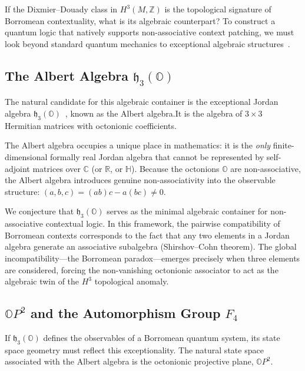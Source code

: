 \documentclass[11pt]{article}
\begin{document}
If the Dixmier--Douady class in $H^3(M, \mathbb{Z})$ is the topological signature of Borromean contextuality, what is its algebraic counterpart? To construct a quantum logic that natively supports non-associative context patching, we must look beyond standard quantum mechanics to exceptional algebraic structures~\cite{Jacobson68}.

\subsection{The Albert Algebra $\mathfrak{h}_3(\mathbb{O})$}

The natural candidate for this algebraic container is the exceptional Jordan algebra $\mathfrak{h}_3(\mathbb{O})$~\cite{Jacobson68,Baez02,Conway03}, known as the Albert algebra.\linebreak It is the algebra of $3 \times 3$ Hermitian matrices with octonionic coefficients.

The Albert algebra occupies a unique place in mathematics: it is the \emph{only} finite-dimensional formally real Jordan algebra that cannot be represented by self-adjoint matrices over $\mathbb{C}$ (or $\mathbb{R}$, or $\mathbb{H}$). Because the octonions $\mathbb{O}$ are non-associative, the Albert algebra introduces genuine non-associativity into the observable structure: $(a,b,c) = (ab)c - a(bc) \neq 0$.

We conjecture that $\mathfrak{h}_3(\mathbb{O})$ serves as the minimal algebraic container for non-associative contextual logic. In this framework, the pairwise compatibility of Borromean contexts corresponds to the fact that any two elements in a Jordan algebra generate an associative subalgebra (Shirshov--Cohn theorem). The global incompatibility---the Borromean paradox---emerges precisely when three elements are considered, forcing the non-vanishing octonionic associator to act as the algebraic twin of the $H^3$ topological anomaly.

\subsection{$\mathbb{O}P^2$ and the Automorphism Group $F_4$}

If $\mathfrak{h}_3(\mathbb{O})$ defines the observables of a Borromean quantum system, its state space geometry must reflect this exceptionality. The natural state space associated with the Albert algebra is the octonionic projective plane, $\mathbb{O}P^2$.
\end{document}
